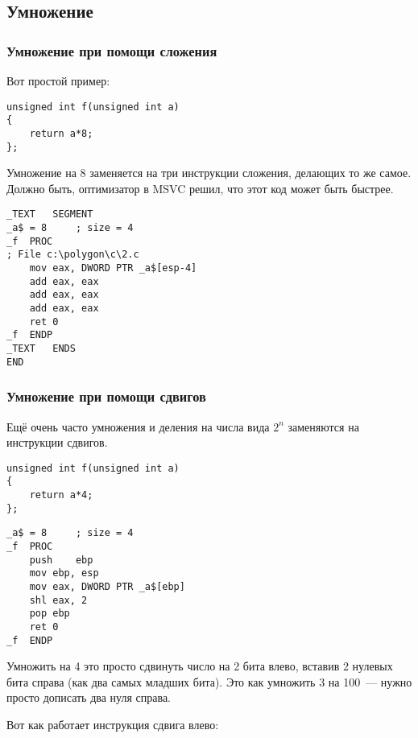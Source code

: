 ﻿\subsection{Умножение}

\subsubsection{Умножение при помощи сложения}

Вот простой пример:

\begin{lstlisting}[caption=\Optimizing MSVC 2010]
unsigned int f(unsigned int a)
{
	return a*8;
};
\end{lstlisting}

Умножение на 8 заменяется на три инструкции сложения, делающих то же самое.
Должно быть, оптимизатор в MSVC решил, что этот код может быть быстрее.

\begin{lstlisting}
_TEXT	SEGMENT
_a$ = 8		; size = 4
_f	PROC
; File c:\polygon\c\2.c
	mov	eax, DWORD PTR _a$[esp-4]
	add	eax, eax
	add	eax, eax
	add	eax, eax
	ret	0
_f	ENDP
_TEXT	ENDS
END
\end{lstlisting}

\subsubsection{Умножение при помощи сдвигов}
\label{subsec:mult_using_shifts}

Ещё очень часто умножения и деления на числа вида $2^{n}$ заменяются на инструкции сдвигов.

\begin{lstlisting}
unsigned int f(unsigned int a)
{
	return a*4;
};
\end{lstlisting}

\begin{lstlisting}[caption=\NonOptimizing MSVC 2010]
_a$ = 8		; size = 4
_f	PROC
	push	ebp
	mov	ebp, esp
	mov	eax, DWORD PTR _a$[ebp]
	shl	eax, 2
	pop	ebp
	ret	0
_f	ENDP
\end{lstlisting}

Умножить на 4 это просто сдвинуть число на 2 бита влево, 
вставив 2 нулевых бита справа (как два самых младших бита). 
Это как умножить 3 на 100~--- нужно просто дописать два нуля справа.

Вот как работает инструкция сдвига влево:



